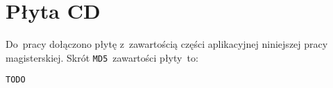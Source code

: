 \documentclass[thesis]{subfiles}
\begin{document}

\appendix
\chapter{Płyta CD}
Do~pracy dołączono płytę z~zawartością części aplikacyjnej niniejszej pracy magisterskiej. Skrót \texttt{MD5}~zawartości płyty~to:
\begin{center}
\texttt{TODO}
\end{center}
\end{document}
